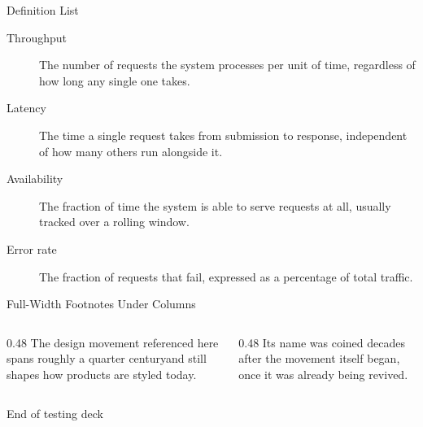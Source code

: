 \documentclass[aspectratio=169]{beamer}
\begin{document}
\begin{frame}{Definition List}
  \begin{description}
    \item[Throughput] The number of requests the system processes per
      unit of time, regardless of how long any single one takes.
    \item[Latency] The time a single request takes from submission to
      response, independent of how many others run alongside it.
    \item[Availability] The fraction of time the system is able to
      serve requests at all, usually tracked over a rolling window.
    \item[Error rate] The fraction of requests that fail, expressed as
      a percentage of total traffic.
  \end{description}
\end{frame}

\begin{frame}{Full-Width Footnotes Under Columns}
  \begin{columns}[T]
    \begin{column}{0.48\textwidth}
      The design movement referenced here spans roughly a quarter
      century\footnotemark[1] and still shapes how products are
      styled today.
    \end{column}
    \begin{column}{0.48\textwidth}
      Its name was coined decades after the movement itself
      began\footnotemark[2], once it was already being revived.
    \end{column}
  \end{columns}
\end{frame}


{
\begin{frame}
  \begin{center}
    \Large
    End of testing deck
  \end{center}
\end{frame}
}

\end{document}
